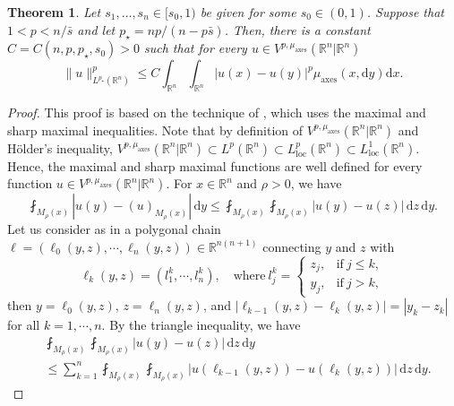\documentclass[11pt]{amsart}
\theoremstyle{plain}
\newtheorem{theorem}{Theorem}[section]
\theoremstyle{definition}
\numberwithin{equation}{section}
\newcommand{\R}{\mathbb{R}}
\begin{document}
\begin{theorem}\label{thm:sobolev}
Let $s_1,\dots,s_n\in[s_0,1)$ be given for some $s_0\in(0,1)$. Suppose that $1 < p < n/\bar{s}$ and let $p_{\star} = np/(n-p\bar{s})$. Then, there is a constant $C = C(n, p, p_{\star}, s_0) > 0$ such that
for every $u \in V^{p,\mu_\mathrm{axes}}(\mathbb{R}^n | \mathbb{R}^n)$
\begin{equation} \label{eq:sobolev}
\|u\|_{L^{p_{\star}}(\mathbb{R}^n)}^p \leq C \int_{\mathbb{R}^n} \int_{\mathbb{R}^n} |u(x)-u(y)|^p \mu_{\mathrm{axes}}(x, \mathrm{d}y) \mathrm{d}x.
\end{equation}
\end{theorem}

\begin{proof}
This proof is based on the technique of \cite{NDN20}, which uses the maximal and sharp maximal inequalities. Note that by definition of $V^{p,\mu_\mathrm{axes}}(\mathbb{R}^n | \mathbb{R}^n)$ and Hölder's inequality,  $V^{p,\mu_\mathrm{axes}}(\mathbb{R}^n | \mathbb{R}^n)\subset L^p(\R^n) \subset  L^p_{\mathrm{loc}}(\mathbb{R}^n) \subset  L^1_{\mathrm{loc}}(\mathbb{R}^n)$. 
Hence, the maximal and sharp maximal functions are well defined for every function $u \in V^{p,\mu_\mathrm{axes}}(\mathbb{R}^n | \mathbb{R}^n)$.
For $x \in \mathbb{R}^n$ and $\rho > 0$, we have
\begin{equation} \label{eq:avg}
\fint_{M_\rho(x)} |u(y) - (u)_{M_\rho(x)}| \,\mathrm{d}y \leq \fint_{M_\rho(x)} \fint_{M_\rho(x)} |u(y) - u(z)| \,\mathrm{d}z \,\mathrm{d}y.
\end{equation}
Let us consider as in \cite[Lemma 2.1]{CK20} a polygonal chain $\ell = (\ell_0(y,z), \cdots, \ell_n(y,z)) \in \mathbb{R}^{n(n+1)}$ connecting $y$ and $z$ with
\begin{equation*}
\ell_k(y,z) = (l_1^k, \cdots, l_n^k), \quad\text{where}~
l_j^k =
\begin{cases}
z_j, &\text{if}~ j \leq k, \\
y_j, &\text{if}~ j > k,
\end{cases}
\end{equation*}
then $y=\ell_0(y,z)$, $z = \ell_n(y,z)$, and $|\ell_{k-1}(y,z) - \ell_k(y,z)| = |y_k-z_k|$ for all $k=1,\cdots, n$. By the triangle inequality, we have
\begin{equation} \label{eq:tri_ineq}
\begin{split}
&\fint_{M_\rho(x)} \fint_{M_\rho(x)} |u(y) - u(z)| \,\mathrm{d}z \,\mathrm{d}y \\
&\leq \sum_{k=1}^n \fint_{M_\rho(x)} \fint_{M_\rho(x)} |u(\ell_{k-1}(y,z)) - u(\ell_k(y,z))| \,\mathrm{d}z\,\mathrm{d}y.

\end{split}
\end{equation}
\end{proof}
\end{document}

